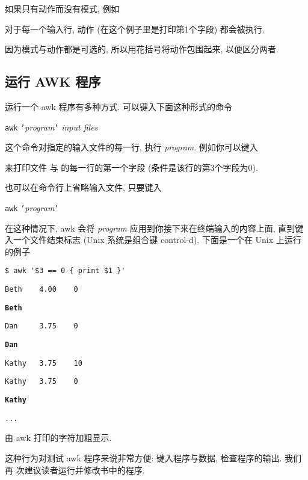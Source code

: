 如果只有动作而没有模式, 例如
对于每一个输入行, 动作 (在这个例子里是打印第1个字段) 都会被执行.

因为模式与动作都是可选的, 所以用花括号将动作包围起来, 以便区分两者.

\subsection{运行 AWK 程序}
\label{running_an_awk_program}

运行一个 awk 程序有多种方式. 可以键入下面这种形式的命令
\begin{pattern}
    \texttt{awk} \texttt{'}\textit{program}\texttt{'} \textit{input files}
\end{pattern}
这个命令对指定的输入文件的每一行, 执行 \textit{program}. 例如你可以键入
来打印文件  与  的每一行的第一个字段
(条件是该行的第3个字段为0).

也可以在命令行上省略输入文件, 只要键入
\begin{pattern}
    \texttt{awk} \texttt{'}\textit{program}\texttt{'}
\end{pattern}
在这种情况下, awk 会将 \textit{program} 应用到你接下来在终端输入的内容上面,
直到键入一个文件结束标志 (Unix 系统是组合键 control-d). 下面是一个在 Unix
上运行的例子
\begin{pattern}
    \indent\verb"$ awk '$3 == 0 { print $1 }'"\par
    \indent\verb'Beth    4.00    0'\par
    \indent\textbf{\texttt{Beth}}\par
    \indent\verb'Dan     3.75    0'\par
    \indent\textbf{\texttt{Dan}}\par
    \indent\verb'Kathy   3.75    10'\par
    \indent\verb'Kathy   3.75    0'\par
    \indent\textbf{\texttt{Kathy}}\par
    \indent\verb'...'\par
\end{pattern}
由 awk 打印的字符加粗显示.

这种行为对测试 awk 程序来说非常方便: 键入程序与数据, 检查程序的输出. 我们再
次建议读者运行并修改书中的程序.

